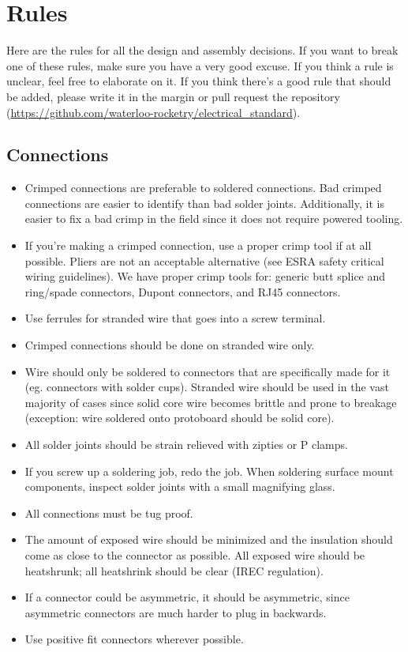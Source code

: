 \documentclass{article}
\begin{document}
\section{Rules}
Here are the rules for all the design and assembly decisions. If you want to break one of these rules, make sure you have a very good excuse. If you think a rule is unclear, feel free to elaborate on it. If you think there's a good rule that should be added, please write it in the margin or pull request the repository (\url{https://github.com/waterloo-rocketry/electrical\_standard}).

\subsection{Connections}
\begin{itemize}
\item Crimped connections are preferable to soldered connections. Bad crimped connections are easier to identify than bad solder joints. Additionally, it is easier to fix a bad crimp in the field since it does not require powered tooling.
\item If you're making a crimped connection, use a proper crimp tool if at all possible. Pliers are not an acceptable alternative (see ESRA safety critical wiring guidelines). We have proper crimp tools for: generic butt splice and ring/spade connectors, Dupont connectors, and RJ45 connectors.
\item Use ferrules for stranded wire that goes into a screw terminal.
\item Crimped connections should be done on stranded wire only.
\item Wire should only be soldered to connectors that are specifically made for it (eg. connectors with solder cups). Stranded wire should be used in the vast majority of cases since solid core wire becomes brittle and prone to breakage (exception: wire soldered onto protoboard should be solid core).
\item All solder joints should be strain relieved with zipties or P clamps.
\item If you screw up a soldering job, redo the job. When soldering surface mount components, inspect solder joints with a small magnifying glass.
\item All connections must be tug proof.
\item The amount of exposed wire should be minimized and the insulation should come as close to the connector as possible. All exposed wire should be heatshrunk; all heatshrink should be clear (IREC regulation).
\item If a connector could be asymmetric, it should be asymmetric, since asymmetric connectors are much harder to plug in backwards.
\item Use positive fit connectors wherever possible.
\end{itemize}
\end{document}
